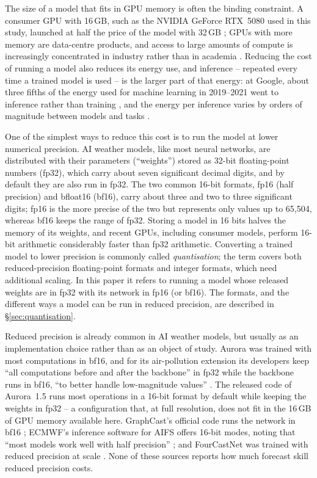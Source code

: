  The
size of a model that fits in GPU memory is often the binding constraint.
A consumer GPU with 16\,GB, such as the NVIDIA GeForce
RTX~5080 used in this study, launched at half the price of the model
with 32\,GB \citep{nvidia2025rtx50}; GPUs with more memory are
data-centre products, and access to large amounts of compute is
increasingly concentrated in industry rather than in academia
\citep{besiroglu2024compute}. Reducing the cost of running a model
also reduces its energy use, and inference -- repeated every time a
trained model is used -- is the larger part of that energy: at Google,
about three fifths of the energy used for machine learning in
2019--2021 went to inference rather than training
\citep{patterson2022carbon}, and the energy per inference varies by
orders of magnitude between models and tasks \citep{luccioni2024power}.

One of the simplest ways to reduce this cost is to run the model at
lower numerical precision. AI weather models, like most neural networks,
are distributed with their parameters (``weights'') stored as 32-bit
floating-point numbers (fp32), which carry about seven significant
decimal digits, and by default they are also run in fp32. The two common
16-bit formats, fp16 (half precision) and bfloat16 (bf16), carry about
three and two to three significant digits; fp16 is the more precise of
the two but represents only values up to 65{,}504, whereas bf16 keeps the
range of fp32. Storing a model in 16 bits halves the memory of its
weights, and recent GPUs, including consumer models, perform 16-bit
arithmetic considerably faster than fp32 arithmetic. Converting a trained
model to lower precision is commonly called \emph{quantisation}; the
term covers both reduced-precision floating-point formats and integer
formats, which need additional scaling. In this paper it refers to
running a model whose released weights are in fp32 with its network in
fp16 (or bf16). The formats, and the different ways a model can be run in
reduced precision, are described in \S\ref{sec:quantisation}.

Reduced precision is already common in AI weather models, but usually
as an implementation choice rather than as an object of study. Aurora
was trained with most computations in bf16, and for its air-pollution
extension its developers keep ``all computations before and after the
backbone'' in fp32 while the backbone runs in bf16, ``to better handle
low-magnitude values'' \citep{bodnar2024aurora}. The released code of
Aurora~1.5 runs most operations in a 16-bit format by default while
keeping the weights in fp32 -- a configuration that, at full
resolution, does not fit in the 16\,GB of GPU memory available here.
GraphCast's official code runs the network in bf16
\citep{lam2023graphcast, deepmind_weathernext_casting}; ECMWF's
inference software for AIFS offers 16-bit modes, noting that ``most
models work well with half precision'' \citep{anemoi_inference_precision};
and FourCastNet was trained with reduced precision at scale
\citep{kurth2023fourcastnet}. None of these sources reports how much
forecast skill reduced precision costs.

